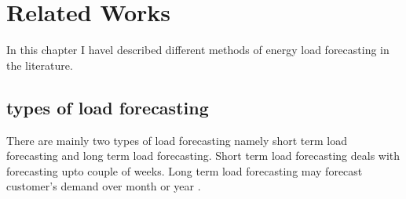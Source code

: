 
\chapter{Related Works}


In this chapter I havel described different methods of energy load forecasting in the literature. 

\section{types of load forecasting}
There are mainly two types of load forecasting namely short term load forecasting and long term load forecasting. Short term load forecasting deals with forecasting upto couple of weeks. Long term load forecasting may forecast customer's demand over month or year \cite{cho1995customer}.

